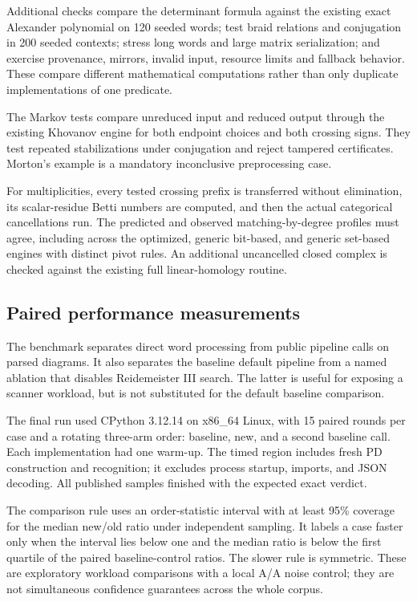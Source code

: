 \documentclass[11pt,letterpaper]{article}
\theoremstyle{definition}
\begin{document}
Additional checks compare the determinant formula against the existing
exact Alexander polynomial on 120 seeded words; test braid
relations and conjugation in 200 seeded contexts; stress long words and large matrix
serialization; and exercise provenance, mirrors, invalid input,
resource limits and fallback behavior. These compare different
mathematical computations rather than only duplicate implementations of
one predicate.

The Markov tests compare unreduced input and reduced output through
the existing Khovanov engine for both endpoint choices and both crossing
signs. They test repeated stabilizations under conjugation and reject
tampered certificates. Morton's example is a mandatory inconclusive
preprocessing case.

For multiplicities, every tested crossing prefix is transferred without
elimination, its scalar-residue Betti numbers are computed, and then the
actual categorical cancellations run. The predicted and observed
matching-by-degree profiles must agree, including across the optimized,
generic bit-based, and generic set-based engines with distinct pivot
rules. An additional uncancelled closed complex is checked against the
existing full linear-homology routine.

\subsection{Paired performance measurements}

The benchmark separates direct word processing from public pipeline
calls on parsed diagrams. It also separates the baseline default
pipeline from a named ablation that disables Reidemeister III search.
The latter is useful for exposing a scanner workload, but is not
substituted for the default baseline comparison.

The final run used CPython 3.12.14 on x86\_64 Linux, with 15 paired
rounds per case and a rotating three-arm order: baseline, new, and a
second baseline call. Each implementation had one warm-up. The timed
region includes fresh PD construction and recognition; it excludes
process startup, imports, and JSON decoding. All published samples
finished with the expected exact verdict.

The comparison rule uses an order-statistic interval with at least 95\%
coverage for the median new/old ratio under independent sampling. It
labels a case faster only when the interval lies below one and the
median ratio is below the first quartile of the paired baseline-control
ratios. The slower rule is symmetric. These are exploratory workload
comparisons with a local A/A noise control; they are not simultaneous
confidence guarantees across the whole corpus.
\end{document}
